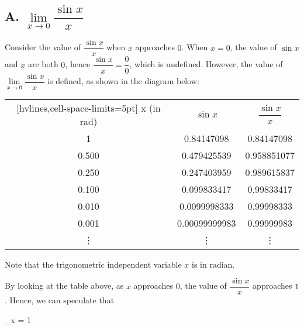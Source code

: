\documentclass[12pt]{report}
\begin{document}
\subsection*{A. $\lim\limits_{x \to 0} \dfrac{\sin x}{x}$}

Consider the value of $\dfrac{\sin x}{x}$ when $x$ approaches $0$. When $x =
    0$, the value of $\sin x$ and $x$ are both $0$, hence $\dfrac{\sin x}{x} =
    \dfrac{0}{0}$, which is undefined. However, the value of $\lim\limits_{x \to 0}
    \dfrac{\sin x}{x}$ is defined, as shown in the diagram below:
\begin{center}
    \begin{NiceTabular}{|c|c|c|}[hvlines,cell-space-limits=5pt]
        x (in rad) & $\sin x$ & $\dfrac{\sin x}{x}$ \\
        1 & 0.84147098 & 0.84147098 \\
        0.500 & 0.479425539 & 0.958851077 \\
        0.250 & 0.247403959 & 0.989615837 \\
        0.100 & 0.099833417 & 0.99833417 \\
        0.010 & 0.0099998333 & 0.99998333 \\
        0.001 & 0.00099999983 & 0.99999983 \\
        \vdots & \vdots & \vdots \\
    \end{NiceTabular}
\end{center}
Note that the trigonometric independent variable $x$ is in radian.

By looking at the table above, as $x$ approaches $0$, the value of $\dfrac{\sin
        x}{x}$ approaches $1$. Hence, we can speculate that
\begin{mdframed}[style=MyFrame]
    \begin{cequation}
        \lim\limits_{x }  = 1
    \end{cequation}
\end{mdframed}
\end{document}
